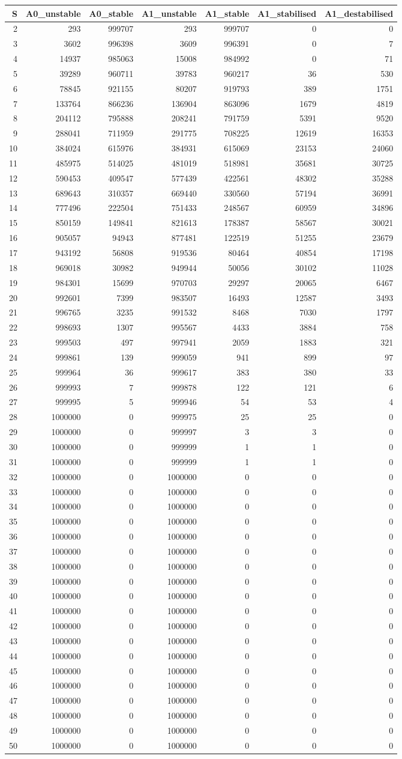 \documentclass[]{article}
\begin{document}
\begin{longtable}[]{@{}rrrrrrr@{}}
\toprule
S & A0\_unstable & A0\_stable & A1\_unstable & A1\_stable &
A1\_stabilised & A1\_destabilised\tabularnewline
\midrule
\endhead
2 & 293 & 999707 & 293 & 999707 & 0 & 0\tabularnewline
3 & 3602 & 996398 & 3609 & 996391 & 0 & 7\tabularnewline
4 & 14937 & 985063 & 15008 & 984992 & 0 & 71\tabularnewline
5 & 39289 & 960711 & 39783 & 960217 & 36 & 530\tabularnewline
6 & 78845 & 921155 & 80207 & 919793 & 389 & 1751\tabularnewline
7 & 133764 & 866236 & 136904 & 863096 & 1679 & 4819\tabularnewline
8 & 204112 & 795888 & 208241 & 791759 & 5391 & 9520\tabularnewline
9 & 288041 & 711959 & 291775 & 708225 & 12619 & 16353\tabularnewline
10 & 384024 & 615976 & 384931 & 615069 & 23153 & 24060\tabularnewline
11 & 485975 & 514025 & 481019 & 518981 & 35681 & 30725\tabularnewline
12 & 590453 & 409547 & 577439 & 422561 & 48302 & 35288\tabularnewline
13 & 689643 & 310357 & 669440 & 330560 & 57194 & 36991\tabularnewline
14 & 777496 & 222504 & 751433 & 248567 & 60959 & 34896\tabularnewline
15 & 850159 & 149841 & 821613 & 178387 & 58567 & 30021\tabularnewline
16 & 905057 & 94943 & 877481 & 122519 & 51255 & 23679\tabularnewline
17 & 943192 & 56808 & 919536 & 80464 & 40854 & 17198\tabularnewline
18 & 969018 & 30982 & 949944 & 50056 & 30102 & 11028\tabularnewline
19 & 984301 & 15699 & 970703 & 29297 & 20065 & 6467\tabularnewline
20 & 992601 & 7399 & 983507 & 16493 & 12587 & 3493\tabularnewline
21 & 996765 & 3235 & 991532 & 8468 & 7030 & 1797\tabularnewline
22 & 998693 & 1307 & 995567 & 4433 & 3884 & 758\tabularnewline
23 & 999503 & 497 & 997941 & 2059 & 1883 & 321\tabularnewline
24 & 999861 & 139 & 999059 & 941 & 899 & 97\tabularnewline
25 & 999964 & 36 & 999617 & 383 & 380 & 33\tabularnewline
26 & 999993 & 7 & 999878 & 122 & 121 & 6\tabularnewline
27 & 999995 & 5 & 999946 & 54 & 53 & 4\tabularnewline
28 & 1000000 & 0 & 999975 & 25 & 25 & 0\tabularnewline
29 & 1000000 & 0 & 999997 & 3 & 3 & 0\tabularnewline
30 & 1000000 & 0 & 999999 & 1 & 1 & 0\tabularnewline
31 & 1000000 & 0 & 999999 & 1 & 1 & 0\tabularnewline
32 & 1000000 & 0 & 1000000 & 0 & 0 & 0\tabularnewline
33 & 1000000 & 0 & 1000000 & 0 & 0 & 0\tabularnewline
34 & 1000000 & 0 & 1000000 & 0 & 0 & 0\tabularnewline
35 & 1000000 & 0 & 1000000 & 0 & 0 & 0\tabularnewline
36 & 1000000 & 0 & 1000000 & 0 & 0 & 0\tabularnewline
37 & 1000000 & 0 & 1000000 & 0 & 0 & 0\tabularnewline
38 & 1000000 & 0 & 1000000 & 0 & 0 & 0\tabularnewline
39 & 1000000 & 0 & 1000000 & 0 & 0 & 0\tabularnewline
40 & 1000000 & 0 & 1000000 & 0 & 0 & 0\tabularnewline
41 & 1000000 & 0 & 1000000 & 0 & 0 & 0\tabularnewline
42 & 1000000 & 0 & 1000000 & 0 & 0 & 0\tabularnewline
43 & 1000000 & 0 & 1000000 & 0 & 0 & 0\tabularnewline
44 & 1000000 & 0 & 1000000 & 0 & 0 & 0\tabularnewline
45 & 1000000 & 0 & 1000000 & 0 & 0 & 0\tabularnewline
46 & 1000000 & 0 & 1000000 & 0 & 0 & 0\tabularnewline
47 & 1000000 & 0 & 1000000 & 0 & 0 & 0\tabularnewline
48 & 1000000 & 0 & 1000000 & 0 & 0 & 0\tabularnewline
49 & 1000000 & 0 & 1000000 & 0 & 0 & 0\tabularnewline
50 & 1000000 & 0 & 1000000 & 0 & 0 & 0\tabularnewline
\bottomrule
\end{longtable}
\end{document}

